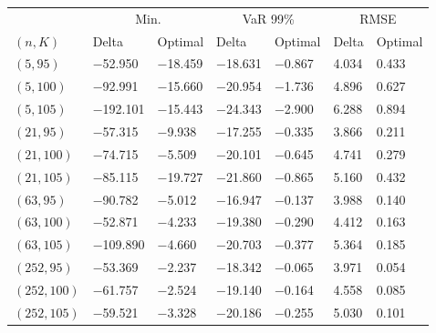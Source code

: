\begin{tabular}{lllllll}
\toprule
& \multicolumn{2}{c}{Min.} & \multicolumn{2}{c}{VaR 99\%} & \multicolumn{2}{c}{RMSE}\\
$(n,K)$& Delta & Optimal & Delta & Optimal & Delta & Optimal\\
\midrule
$(5,95)$ & \num{-52.950} & \num{-18.459} & \num{-18.631} & \num{-0.867} & \num{4.034} & \num{0.433}\\
$(5,100)$ & \num{-92.991} & \num{-15.660} & \num{-20.954} & \num{-1.736} & \num{4.896} & \num{0.627}\\
$(5,105)$ & \num{-192.101} & \num{-15.443} & \num{-24.343} & \num{-2.900} & \num{6.288} & \num{0.894}\\
$(21,95)$ & \num{-57.315} & \num{-9.938} & \num{-17.255} & \num{-0.335} & \num{3.866} & \num{0.211}\\
$(21,100)$ & \num{-74.715} & \num{-5.509} & \num{-20.101} & \num{-0.645} & \num{4.741} & \num{0.279}\\
$(21,105)$ & \num{-85.115} & \num{-19.727} & \num{-21.860} & \num{-0.865} & \num{5.160} & \num{0.432}\\
$(63,95)$ & \num{-90.782} & \num{-5.012} & \num{-16.947} & \num{-0.137} & \num{3.988} & \num{0.140}\\
$(63,100)$ & \num{-52.871} & \num{-4.233} & \num{-19.380} & \num{-0.290} & \num{4.412} & \num{0.163}\\
$(63,105)$ & \num{-109.890} & \num{-4.660} & \num{-20.703} & \num{-0.377} & \num{5.364} & \num{0.185}\\
$(252,95)$ & \num{-53.369} & \num{-2.237} & \num{-18.342} & \num{-0.065} & \num{3.971} & \num{0.054}\\
$(252,100)$ & \num{-61.757} & \num{-2.524} & \num{-19.140} & \num{-0.164} & \num{4.558} & \num{0.085}\\
$(252,105)$ & \num{-59.521} & \num{-3.328} & \num{-20.186} & \num{-0.255} & \num{5.030} & \num{0.101}\\
\bottomrule
\end{tabular}